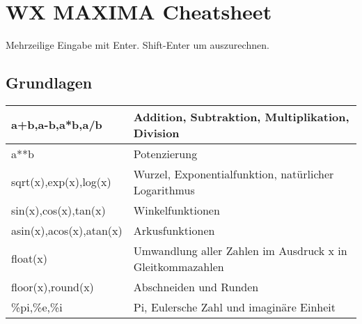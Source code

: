 \documentclass[../main.tex]{subfiles}
\begin{document}

\chapter{WX MAXIMA Cheatsheet}
Mehrzeilige Eingabe mit Enter. Shift-Enter um auszurechnen.

\section{Grundlagen}
\begin{tabularx}{0.8\textwidth} { 
    >{\centering\arraybackslash}X 
    >{\centering\arraybackslash}X  }
    a+b,a-b,a*b,a/b & Addition, Subtraktion, Multiplikation, Division
    \\ [7pt]
    \hline
    a**b & Potenzierung
    \\ [7pt]
    \hline
    sqrt(x),exp(x),log(x) & Wurzel, Exponentialfunktion, natürlicher Logarithmus
    \\ [7pt]
    \hline
    sin(x),cos(x),tan(x) & Winkelfunktionen
    \\ [7pt]
    \hline
    asin(x),acos(x),atan(x) & Arkusfunktionen
    \\ [7pt]
    \hline
    float(x) & Umwandlung aller Zahlen im Ausdruck x in Gleitkommazahlen
    \\ [7pt]
    \hline
    floor(x),round(x) & Abschneiden und Runden
    \\ [7pt]
    \hline
    \%pi,\%e,\%i & Pi, Eulersche Zahl und imaginäre Einheit
    \\ [7pt]
\end{tabularx}
\end{document}
